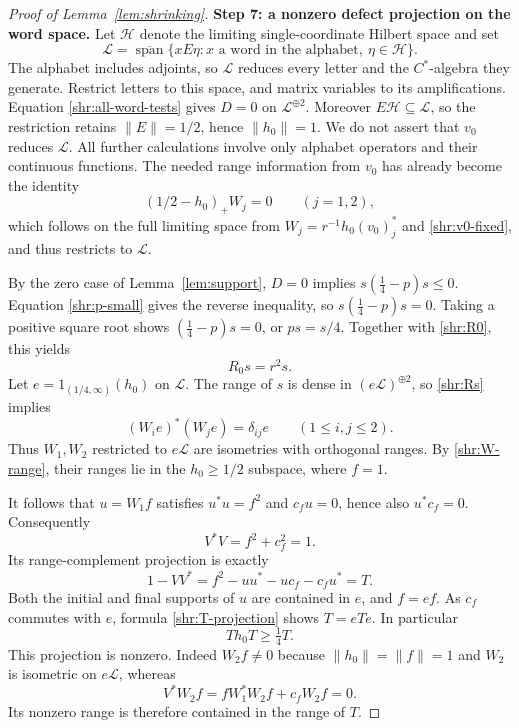 \begin{proof}[Proof of Lemma~\ref{lem:shrinking}]
\medskip
\noindent\textbf{Step 7: a nonzero defect projection on the word space.}
Let $\mathcal H$ denote the limiting single-coordinate Hilbert space and
set
\[
 \mathcal L=\overline{\operatorname{span}}
 \{xE\eta:x\text{ a word in the alphabet},\ \eta\in\mathcal H\}.
\]
The alphabet includes adjoints, so $\mathcal L$ reduces every letter and
the $C^*$-algebra they generate.  Restrict letters to this space, and
matrix variables to its amplifications.  Equation
\eqref{shr:all-word-tests} gives $D=0$ on $\mathcal L^{\oplus2}$.
Moreover $E\mathcal H\subseteq\mathcal L$, so the restriction retains
$\|E\|=1/2$, hence $\|h_0\|=1$.  We do not assert that $v_0$ reduces
$\mathcal L$.  All further calculations involve only alphabet operators
and their continuous functions.  The needed range information from
$v_0$ has already become the identity
\begin{equation}\label{shr:W-range}
 (1/2-h_0)_+W_j=0\qquad(j=1,2),
\end{equation}
which follows on the full limiting space from
$W_j=r^{-1}h_0(v_0)_j^*$ and \eqref{shr:v0-fixed}, and thus restricts to
$\mathcal L$.

By the zero case of Lemma~\ref{lem:support}, $D=0$ implies
$s(\frac14-p)s\le0$.  Equation \eqref{shr:p-small} gives the reverse
inequality, so $s(\frac14-p)s=0$.  Taking a positive square root shows
$(\frac14-p)s=0$, or $ps=s/4$.  Together with \eqref{shr:R0}, this yields
\begin{equation}\label{shr:Rs}
 R_0s=r^2s.
\end{equation}
Let $e=1_{(1/4,\infty)}(h_0)$ on $\mathcal L$.  The range of $s$ is dense
in $(e\mathcal L)^{\oplus2}$, so \eqref{shr:Rs} implies
\[
 (W_i e)^*(W_j e)=\delta_{ij}e\qquad(1\le i,j\le2).
\]
Thus $W_1,W_2$ restricted to $e\mathcal L$ are isometries with orthogonal
ranges.  By \eqref{shr:W-range}, their ranges lie in the
$h_0\ge1/2$ subspace, where $f=1$.

It follows that $u=W_1f$ satisfies $u^*u=f^2$ and $c_fu=0$, hence also
$u^*c_f=0$.  Consequently
\[
 V^*V=f^2+c_f^2=1.
\]
Its range-complement projection is exactly
\begin{equation}\label{shr:T-projection}
 1-VV^*=f^2-uu^*-uc_f-c_fu^*=T.
\end{equation}
Both the initial and final supports of $u$ are contained in $e$, and
$f=ef$.  As $c_f$ commutes with $e$, formula \eqref{shr:T-projection}
shows $T=eTe$.  In particular
\begin{equation}\label{shr:ThT}
 Th_0T\ge\tfrac14 T.
\end{equation}
This projection is nonzero.  Indeed $W_2f\ne0$ because
$\|h_0\|=\|f\|=1$ and $W_2$ is isometric on $e\mathcal L$, whereas
\[
 V^*W_2f=fW_1^*W_2f+c_fW_2f=0.
\]
Its nonzero range is therefore contained in the range of $T$.


\end{proof}
